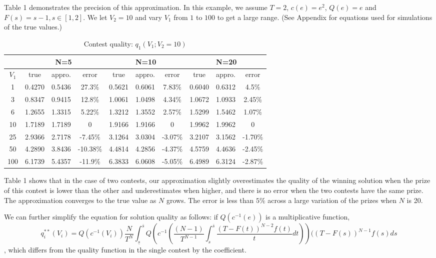 \documentclass[12pt]{article}
\begin{document}
Table 1 demonstrates the precision of this approximation. In this example,
we assume $T=2$, $c(e)=e^{2}$, $Q(e)=e$ and $F(s)=s-1,s\in[1,2]$.
We let $V_{2}=10$ and vary $V_{1}$ from $1$ to $100$ to get a
large range. (See Appendix for equations used for simulations of the true values.)
\begin{table}
\begin{tabular}{|c|c|c|c|c|c|c|c|c|c|}
\hline
 & \multicolumn{3}{c|}{N=5} & \multicolumn{3}{c|}{N=10} & \multicolumn{3}{c|}{N=20}\tabularnewline
\hline
$V_{1}$  & true  & appro.  & error  & true  & appro.  & error  & true  & appro.  & error\tabularnewline
\hline
\hline
1  & 0.4270  & 0.5436  & 27.3\%  & 0.5621  & 0.6061  & 7.83\%  & 0.6040  & 0.6312  & 4.5\%\tabularnewline
\hline
3  & 0.8347  & 0.9415  & 12.8\%  & 1.0061  & 1.0498  & 4.34\%  & 1.0672  & 1.0933  & 2.45\%\tabularnewline
\hline
6  & 1.2655  & 1.3315  & 5.22\%  & 1.3212  & 1.3552  & 2.57\%  & 1.5299  & 1.5462  & 1.07\%\tabularnewline
\hline
10  & 1.7189  & 1.7189  & 0  & 1.9166  & 1.9166  & 0  & 1.9962  & 1.9962  & 0\tabularnewline
\hline
25  & 2.9366  & 2.7178  & -7.45\%  & 3.1264  & 3.0304  & -3.07\%  & 3.2107  & 3.1562  & -1.70\%\tabularnewline
\hline
50  & 4.2890  & 3.8436  & -10.38\%  & 4.4814  & 4.2856  & -4.37\%  & 4.5759  & 4.4636  & -2.45\%\tabularnewline
\hline
100  & 6.1739  & 5.4357  & -11.9\%  & 6.3833  & 6.0608  & -5.05\%  & 6.4989  & 6.3124  & -2.87\%\tabularnewline
\hline
\end{tabular}\caption{Contest quality: $q_{1}(V_{1};V_{2}=10)$}
\end{table}

Table 1 shows that in the case of two contests, our approximation slightly overestimates the quality of the winning solution when the prize of this contest is lower than the other and underestimates when higher, and there is no error when the two contests have the same prize. The approximation converges to the true value as $N$ grows. The error is less than $5\%$ across a large variation of the prizes when $N$ is 20.

We can further simplify the equation for solution quality as follows: if $Q(c^{-1}(e))$ is a multiplicative function,
\begin{equation}
q_{i}^{**}(V_{i})=Q(c^{-1}(V_{i}))\frac{N}{T^{N}}\int_{\underline{s}}^{\overline{s}}Q\left(c^{-1}\left(\frac{(N-1)}{T^{N-1}}\int_{s}^{\overline{s}}\frac{(T-F(t))^{N-2}f(t)}{t}dt\right)\right)((T-F(s))^{N-1}f(s)ds\label{estimate}
\end{equation}
, which differs from the quality function in the single contest by
the coefficient.
\end{document}
